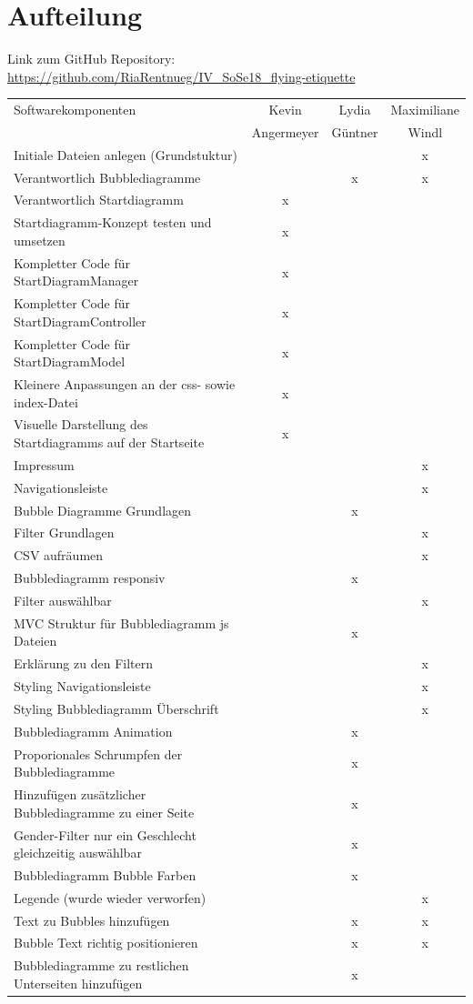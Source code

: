 \documentclass{mi-seminar}
\begin{document}
\section{Aufteilung}
Link zum GitHub Repository: \newline
\href{https://github.com/RiaRentnueg/IV_SoSe18_flying-etiquette}{https://github.com/RiaRentnueg/IV\_SoSe18\_flying-etiquette}
\linebreak \newline
{}
\begin{longtable}{p{5cm} | c | c | c}
Softwarekomponenten & Kevin & Lydia & Maximiliane \\
 & Angermeyer & Güntner & Windl \\
\hline
\endhead
Initiale Dateien anlegen (Grundstuktur)& & & x \\
Verantwortlich Bubblediagramme & & x & x \\
Verantwortlich Startdiagramm & x & & \\
Startdiagramm-Konzept testen und umsetzen & x & & \\
Kompletter Code für StartDiagramManager & x & & \\
Kompletter Code für StartDiagramController & x & & \\
Kompletter Code für StartDiagramModel & x & & \\
Kleinere Anpassungen an der css- sowie index-Datei & x & & \\
Visuelle Darstellung des Startdiagramms auf der Startseite & x & & \\
Impressum & & & x\\
Navigationsleiste & & & x\\
Bubble Diagramme Grundlagen & & x & \\
Filter Grundlagen & & & x \\
CSV aufräumen & & & x \\
Bubblediagramm responsiv & & x & \\
Filter auswählbar & & & x \\
MVC Struktur für Bubblediagramm js Dateien & & x & \\
Erklärung zu den Filtern & & & x \\
Styling Navigationsleiste & & & x \\
Styling Bubblediagramm Überschrift & & & x \\
Bubblediagramm Animation & & x & \\
Proporionales Schrumpfen der Bubblediagramme & & x & \\
Hinzufügen zusätzlicher Bubblediagramme zu einer Seite & & x & \\
Gender-Filter nur ein Geschlecht gleichzeitig auswählbar & & x & \\
Bubblediagramm Bubble Farben & & x & \\
Legende (wurde wieder verworfen) & & & x \\
Text zu Bubbles hinzufügen & & x & x \\
Bubble Text richtig positionieren & & x & x \\
Bubblediagramme zu restlichen Unterseiten hinzufügen & & x & \\



\end{longtable}
\end{document}
